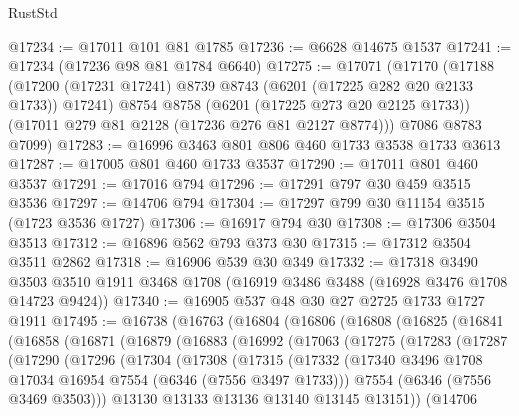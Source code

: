 \begin{lexlean}{RustStd}
\begin{coremodule}
@17234 := @17011 @101 @81 @1785
@17236 := @6628 @14675 @1537
@17241 := @17234 (@17236 @98 @81 @1784 @6640)
@17275 := @17071
    (@17170
      (@17188
        (@17200 (@17231 @17241) @8739 @8743 (@6201 (@17225 @282 @20 @2133 @1733)) @17241)
        @8754
        @8758
        (@6201 (@17225 @273 @20 @2125 @1733))
        (@17011 @279 @81 @2128 (@17236 @276 @81 @2127 @8774)))
      @7086
      @8783
      @7099)
@17283 := @16996 @3463 @801 @806 @460 @1733 @3538 @1733 @3613
@17287 := @17005 @801 @460 @1733 @3537
@17290 := @17011 @801 @460 @3537
@17291 := @17016 @794
@17296 := @17291 @797 @30 @459 @3515 @3536
@17297 := @14706 @794
@17304 := @17297 @799 @30 @11154 @3515 (@1723 @3536 @1727)
@17306 := @16917 @794 @30
@17308 := @17306 @3504 @3513
@17312 := @16896 @562 @793 @373 @30
@17315 := @17312 @3504 @3511 @2862
@17318 := @16906 @539 @30 @349
@17332 := @17318
    @3490
    @3503
    @3510
    @1911
    @3468
    @1708
    (@16919 @3486 @3488 (@16928 @3476 @1708 @14723 @9424))
@17340 := @16905 @537 @48 @30 @27 @2725 @1733 @1727 @1911
@17495 := @16738
    (@16763
      (@16804
        (@16806
          (@16808
            (@16825
              (@16841
                (@16858
                  (@16871
                    (@16879
                      (@16883
                        (@16992
                          (@17063
                            (@17275
                              (@17283
                                (@17287
                                  (@17290
                                    (@17296
                                      (@17304
                                        (@17308
                                          (@17315
                                            (@17332
                                              (@17340
                                                @3496
                                                @1708
                                                @17034
                                                @16954
                                                @7554
                                                (@6346 (@7556 @3497 @1733)))
                                              @7554
                                              (@6346 (@7556 @3469 @3503)))
                                            @13130
                                            @13133
                                            @13136
                                            @13140
                                            @13145
                                            @13151))
                                        (@14706

\end{coremodule}
\end{lexlean}
